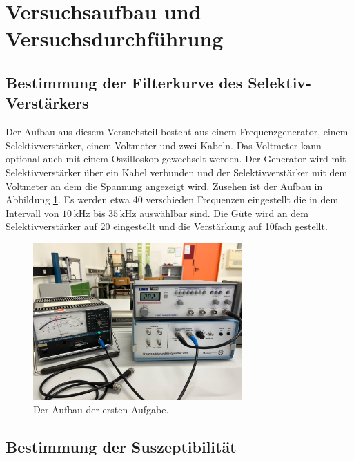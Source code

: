 \section{Versuchsaufbau und Versuchsdurchführung}


\subsection{Bestimmung der Filterkurve des Selektiv-Verstärkers}

\begin{flushleft}
    Der Aufbau aus diesem Versuchsteil besteht aus einem Frequenzgenerator, einem Selektivverstärker, einem Voltmeter und zwei Kabeln.
    Das Voltmeter kann optional auch mit einem Oszilloskop gewechselt werden.
    Der Generator wird mit Selektivverstärker über ein Kabel verbunden und der Selektivverstärker mit dem Voltmeter an dem die Spannung angezeigt wird.
    Zusehen ist der Aufbau in Abbildung \ref{Abbildung4}. 
    Es werden etwa 40 verschieden Frequenzen eingestellt die in dem Intervall von $10\,\unit{\kilo\hertz}$ bis $35\,\unit{\kilo\hertz}$ auswählbar sind.
    Die Güte wird an dem Selektivverstärker auf 20 eingestellt und die Verstärkung auf 10fach gestellt.
\end{flushleft}

\begin{figure}[H]
    \centering
    \includegraphics[height=60mm]{bilder/Ab4.jpeg}
    \caption{Der Aufbau der ersten Aufgabe.\label{Abbildung4} }
\end{figure}

\subsection{Bestimmung der Suszeptibilität}

